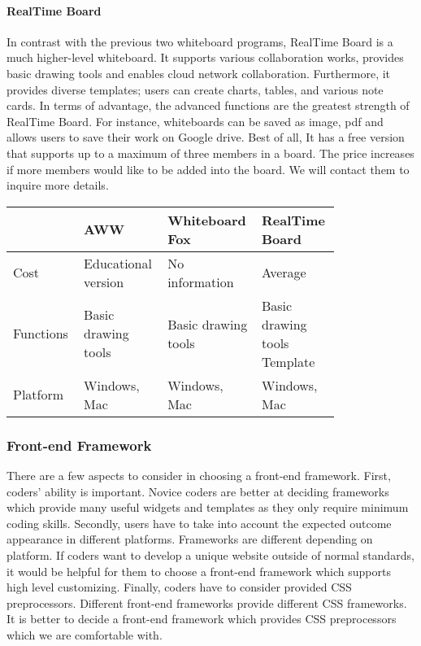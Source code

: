 \documentclass[10pt]{article}
\begin{document}
            \paragraph{RealTime Board}
                In contrast with the previous two whiteboard programs, RealTime Board is a much higher-level whiteboard. It supports various collaboration works, provides basic drawing tools and enables cloud network collaboration. Furthermore, it provides diverse templates; users can create charts, tables, and various note cards. In terms of advantage, the advanced functions are the greatest strength of RealTime Board. For instance, whiteboards can be saved as image, pdf and allows users to save their work on Google drive. Best of all, It has a free version that supports up to a maximum of three members in a board. The price increases if more members would like to be added into the board. We will contact them to inquire more details. \cite{RealTime Board Price}

            \begin{tabular}{ | p{0.2\linewidth} | p{0.2\linewidth} | p{0.2\linewidth} | p{0.2\linewidth} | } \hline
                 & AWW & Whiteboard Fox & RealTime Board \\ \hline
                Cost & Educational version & No information & Average \\ \hline
                Functions & Basic drawing tools & Basic drawing tools & Basic drawing tools Template \\ \hline
                Platform & Windows, Mac & Windows, Mac & Windows, Mac \\ \hline
            \end{tabular}

        \subsubsection{Front-end Framework}
            There are a few aspects to consider in choosing a front-end framework. First, coders’ ability is important. Novice coders are better at deciding frameworks which provide many useful widgets and templates as they only require minimum coding skills. Secondly, users have to take into account the expected outcome appearance in different platforms. Frameworks are different depending on platform. If coders want to develop a unique website outside of normal standards, it would be helpful for them to choose a front-end framework which supports high level customizing. Finally, coders have to consider provided CSS preprocessors. Different front-end frameworks provide different CSS frameworks. It is better to decide a front-end framework which provides CSS preprocessors which we are comfortable with. \cite{Front-end Frameworks}
\end{document}
